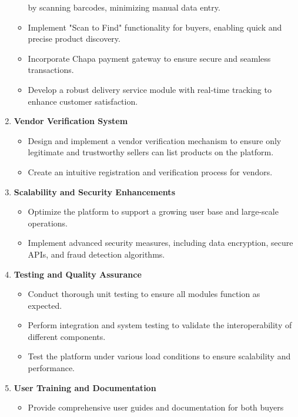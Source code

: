 \documentclass[12pt]{report}
\begin{document}
\begin{enumerate}
\begin{itemize}
		            by scanning barcodes, minimizing manual data entry.
		      \item Implement "Scan to Find" functionality for buyers, enabling quick and
		            precise product discovery.
		      \item Incorporate Chapa payment gateway to ensure secure and seamless
		            transactions.
		      \item Develop a robust delivery service module with real-time tracking to
		            enhance customer satisfaction.
	      \end{itemize}
	\item \textbf{Vendor Verification System}
	      \begin{itemize}
		      \item Design and implement a vendor verification mechanism to ensure only
		            legitimate and trustworthy sellers can list products on the platform.
		      \item Create an intuitive registration and verification process for vendors.
	      \end{itemize}
	\item \textbf{Scalability and Security Enhancements}
	      \begin{itemize}
		      \item Optimize the platform to support a growing user base and large-scale
		            operations.
		      \item Implement advanced security measures, including data encryption,
		            secure APIs, and fraud detection algorithms.
	      \end{itemize}
	\item \textbf{Testing and Quality Assurance}
	      \begin{itemize}
		      \item Conduct thorough unit testing to ensure all modules function as
		            expected.
		      \item Perform integration and system testing to validate the interoperability
		            of different components.
		      \item Test the platform under various load conditions to ensure scalability
		            and performance.
	      \end{itemize}
	\item \textbf{User Training and Documentation}
	      \begin{itemize}
		      \item Provide comprehensive user guides and documentation for both buyers

\end{itemize}
\end{enumerate}
\end{document}
